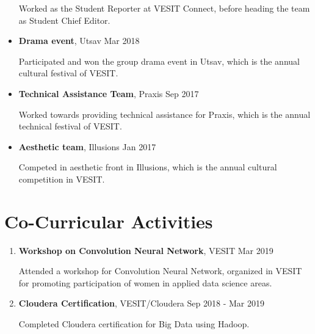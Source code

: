 \documentclass[margin]{res}
\begin{document}
\begin{resume}
\begin{itemize}
  Worked as the Student Reporter at VESIT Connect, before heading the team as Student Chief Editor. 
  
  \item {\bf Drama event}, Utsav \hfill Mar 2018
  
  Participated and won the group drama event in Utsav, which is the annual cultural festival of VESIT.
  \item {\bf Technical Assistance Team}, Praxis \hfill Sep 2017
  
  Worked towards providing technical assistance for Praxis, which is the annual technical festival of VESIT. 
  \item {\bf Aesthetic team}, Illusions \hfill Jan 2017
  
  Competed in aesthetic front in Illusions, which is the annual cultural competition in VESIT.
\end{itemize}

\section{Co-Curricular Activities}
\begin{enumerate}
\item {\bf Workshop on Convolution Neural Network}, VESIT \hfill Mar 2019

Attended a workshop for Convolution Neural Network, organized in VESIT for promoting participation of women in applied data science areas. 
\item {\bf Cloudera Certification}, VESIT/Cloudera \hfill Sep 2018 - Mar 2019

Completed Cloudera certification for Big Data using Hadoop. 
\end{enumerate}


\end{resume}
\end{document}

